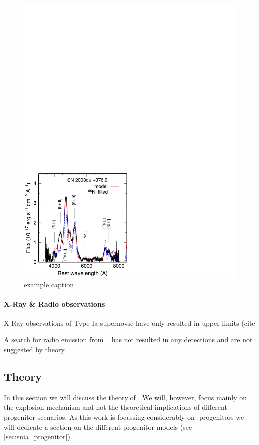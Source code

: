 \begin{figure}[htbp] %
   \centering
   \includegraphics[width=\textwidth]{chapter1/plots/sn2003du_nebular.pdf} 
   \caption{example caption}
   \label{fig:sn2003du_nebular}
\end{figure}


\paragraph{X-Ray \& Radio observations}
X-Ray observations of Type Ia supernovae have only resulted in upper limits (cite

A search for radio emission from \sneia\ \citep{2006ApJ...646..369P} has not resulted in any detections and are not suggested by theory.


\subsection{Theory}
In this section we will discuss the theory of \sneia. We will, however, focus mainly on the explosion mechanism and not the theoretical implications of different progenitor scenarios. As this work is focussing considerably on \snia-progenitors we will dedicate a section on the different progenitor models (see \ref{sec:snia_progenitor}).

